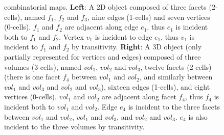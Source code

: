\begin{figure}[ht]
{      combinatorial maps.  \textbf{Left}: A 2D object composed of
      three facets (2-cells), named $f_1$, $f_2$ and $f_3$, nine
      edges (1-cells) and seven vertices (0-cells).  $f_1$ and
      $f_2$ are adjacent along edge $e_1$, thus $e_1$ is incident both
      to $f_1$ and $f_2$. Vertex $v_1$ is incident to edge $e_1$, thus
      $v_1$ is incident to $f_1$ and $f_2$ by transitivity.
      \textbf{Right}: A 3D object (only partially represented for vertices and edges)
      composed of three volumes (3-cells), named $vol_1$, $vol_2$
      and $vol_3$, twelve facets (2-cells) (there is one facet
      $f_4$ between $vol_1$ and $vol_2$, and similarly between $vol_1$
      and $vol_3$ and $vol_2$ and $vol_3$), sixteen edges (1-cells),
      and eight vertices (0-cells). $vol_1$ and $vol_2$ are adjacent
      along facet $f_4$, thus $f_4$ is incident both to $vol_1$ and
      $vol_2$. Edge $e_4$ is incident to the three facets between
      $vol_1$ and $vol_2$, $vol_1$ and $vol_3$, and $vol_2$ and
      $vol_3$.  $e_4$ is also incident to the three volumes by
      transitivity.}
    \label{fig-exemple-3Dmanifold}
\end{figure}

